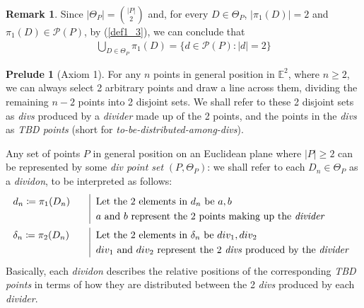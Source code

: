 \documentclass[11pt, oneside]{article}      %
\theoremstyle{definition}
\numberwithin{equation}{section}
\newtheorem*{remark}{Remark}
\newcommand{\reff}[1]{(\ref{#1})}
\theoremstyle{c}
\newtheorem*{prelude}{Prelude}
\begin{document}
\begin{remark}
Since $\lvert\Theta_P\rvert = \binom{\lvert P\rvert}{2}$ and,  for every $D \in \Theta_P$, $|\pi_1(D)| = 2$ and $\pi_1(D) \in \mathcal{P}(P)$, by \reff{def1_3}, we can conclude that
\begin{align}\label{power_set_car_2_as_divider}
\bigcup_{D \in \Theta_P} \pi_1(D) = \{ d \in \mathcal{P}(P): |d| = 2\}
\end{align}
\end{remark}
\begin{prelude}[Axiom 1]
For any $n$ points in general position in $\mathbb{E}^2$, where $n \geq 2$, we can always select 2 arbitrary points and draw a line across them, dividing the remaining $n-2$ points into 2 disjoint sets. We shall refer to these 2 disjoint sets as \textit{divs} produced by a \textit{divider} made up of the 2 points, and the points in the \textit{divs} as \textit{TBD points} (short for \textit{to-be-distributed-among-divs}).

Any set of points $P$ in general position on an Euclidean plane where $\lvert P\rvert \geq 2$ can be represented by some \textit{div point set} $(P,\Theta_P)$: we shall refer to each $D_n \in \Theta_P$ as a \textit{dividon}, to be interpreted as follows:
\begin{equation}
        \begin{aligned}
 &d_n \coloneqq \pi_1(D_n) & \quad & \begin{aligned}[t] \renewcommand\arraystretch{1.25}\begin{array}[t]{|@{\hskip0.6em}l}
   \text{Let the 2 elements in } d_n \text{ be } a, b \\
 a \text{ and } b \text{ represent the 2 points making up the \textit{divider}}   \end{array}  \end{aligned} \\
  &\delta_n \coloneqq \pi_2(D_n) & \quad & \begin{aligned}[t] \renewcommand\arraystretch{1.25}\begin{array}[t]{|@{\hskip0.6em}l}
  \text{Let the 2 elements in } \delta_n \text{ be } div_1, div_2\\
 div_1 \text{ and } div_2 \text{ represent the 2 \textit{divs} produced by the \textit{divider}}  \end{array}  \end{aligned}
 \end{aligned}
 \end{equation}
Basically, each \textit{dividon} describes the relative positions of the corresponding \textit{TBD points} in terms of how they are distributed between the 2 \textit{divs} produced by each \textit{divider}.


\end{prelude}
\end{document}
